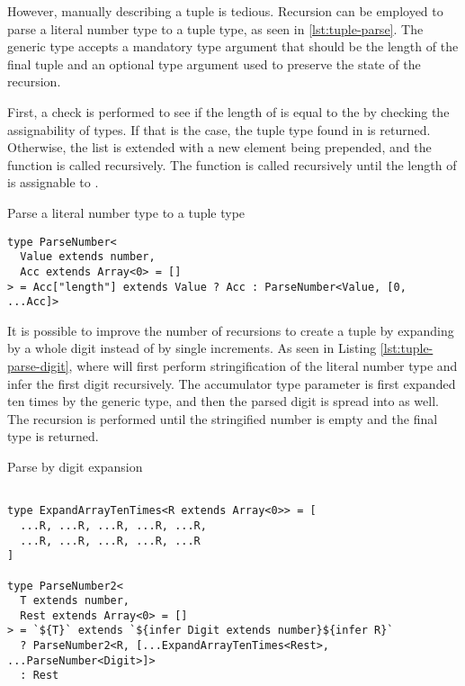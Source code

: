 However, manually describing a tuple is tedious. Recursion can be employed to parse a literal number type to a tuple type, as seen in \ref{lst:tuple-parse}. The  generic type accepts a mandatory type argument  that should be the length of the final tuple and an optional type argument  used to preserve the state of the recursion.

First, a check is performed to see if the length of  is equal to the  by checking the assignability of types. If that is the case, the tuple type found in  is returned. Otherwise, the list is extended with a new  element being prepended, and the function is called recursively. The function is called recursively until the length of  is assignable to .

\begin{listing}[ht]
  \caption{Parse a literal number type to a tuple type}\label{lst:tuple-parse}
  \begin{verbatim}
type ParseNumber<
  Value extends number,
  Acc extends Array<0> = []
> = Acc["length"] extends Value ? Acc : ParseNumber<Value, [0, ...Acc]>
\end{verbatim}
\end{listing}

It is possible to improve the number of recursions to create a tuple by expanding by a whole digit instead of by single increments. As seen in Listing \ref{lst:tuple-parse-digit}, where  will first perform stringification of the literal number type  and infer the first digit recursively. The accumulator type parameter  is first expanded ten times by the  generic type, and then the parsed digit is spread into  as well. The recursion is performed until the stringified number is empty and the final  type is returned.

\begin{listing}[ht]
  \caption{Parse by digit expansion}\label{lst:tuple-parse-digit}
  \begin{verbatim}

type ExpandArrayTenTimes<R extends Array<0>> = [
  ...R, ...R, ...R, ...R, ...R,
  ...R, ...R, ...R, ...R, ...R
]
    
type ParseNumber2<
  T extends number,
  Rest extends Array<0> = []
> = `${T}` extends `${infer Digit extends number}${infer R}`
  ? ParseNumber2<R, [...ExpandArrayTenTimes<Rest>, ...ParseNumber<Digit>]>
  : Rest
\end{verbatim}
\end{listing}

